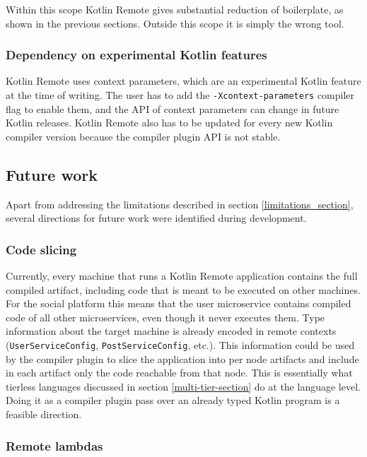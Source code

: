\documentclass[a4paper,11pt,oneside]{article}
\newcommand{\kotlini}[1]{\texttt{#1}}
\begin{document}
Within this scope Kotlin Remote gives substantial reduction of boilerplate, as shown in the
previous sections. Outside this scope it is simply the wrong tool.

\subsubsection{Dependency on experimental Kotlin features}

Kotlin Remote uses context parameters, which are an experimental Kotlin feature at the time of
writing. The user has to add the \texttt{-Xcontext-parameters} compiler flag to enable them, and the API
of context parameters can change in future Kotlin releases. Kotlin Remote also has to be
updated for every new Kotlin compiler version because the compiler plugin API is not stable.

\subsection{Future work}\label{future_work_section}

Apart from addressing the limitations described in section \ref{limitations_section}, several
directions for future work were identified during development.

\subsubsection{Code slicing}

Currently, every machine that runs a Kotlin Remote application contains the full compiled
artifact, including code that is meant to be executed on other machines. For the social
platform this means that the user microservice contains compiled code of all other microservices,
even though it never executes them. Type information about the target machine is already encoded in
remote contexts (\kotlini{UserServiceConfig}, \kotlini{PostServiceConfig}, etc.). This
information could be used by the compiler plugin to slice the application into per node artifacts
and include in each artifact only the code reachable from that node. This is essentially what
tierless languages discussed in section \ref{multi-tier-section} do at the language level.
Doing it as a compiler plugin pass over an already typed Kotlin program is a feasible direction.

\subsubsection{Remote lambdas}
\end{document}
